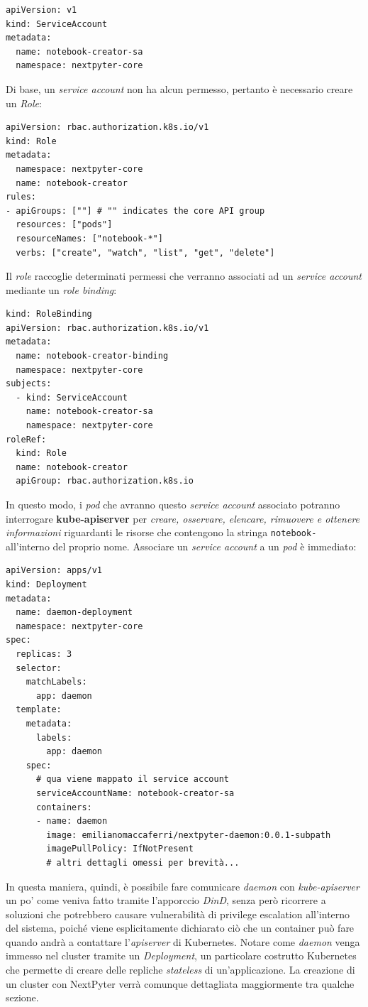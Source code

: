 \begin{verbatim}
apiVersion: v1
kind: ServiceAccount
metadata:
  name: notebook-creator-sa
  namespace: nextpyter-core
\end{verbatim}
Di base, un \textit{service account} non ha alcun permesso, pertanto è necessario creare un \textit{Role}:
\begin{verbatim}
apiVersion: rbac.authorization.k8s.io/v1
kind: Role
metadata:
  namespace: nextpyter-core
  name: notebook-creator
rules:
- apiGroups: [""] # "" indicates the core API group
  resources: ["pods"]
  resourceNames: ["notebook-*"]
  verbs: ["create", "watch", "list", "get", "delete"]
\end{verbatim}
Il \textit{role} raccoglie determinati permessi che verranno associati ad un \textit{service account} mediante un \textit{role binding}:
\begin{verbatim}
kind: RoleBinding
apiVersion: rbac.authorization.k8s.io/v1
metadata:
  name: notebook-creator-binding
  namespace: nextpyter-core
subjects:
  - kind: ServiceAccount
    name: notebook-creator-sa
    namespace: nextpyter-core
roleRef:
  kind: Role
  name: notebook-creator
  apiGroup: rbac.authorization.k8s.io
\end{verbatim}
In questo modo, i \textit{pod} che avranno questo \textit{service account} associato potranno interrogare \textbf{kube-apiserver} per \textit{creare, osservare, elencare, rimuovere e ottenere informazioni} riguardanti le risorse che contengono la stringa \verb|notebook-| all'interno del proprio nome.
\newline
Associare un \textit{service account} a un \textit{pod} è immediato:
\begin{verbatim}
apiVersion: apps/v1
kind: Deployment
metadata:
  name: daemon-deployment
  namespace: nextpyter-core
spec:
  replicas: 3
  selector:
    matchLabels:
      app: daemon
  template:
    metadata:
      labels:
        app: daemon
    spec:
      # qua viene mappato il service account
      serviceAccountName: notebook-creator-sa 
      containers:
      - name: daemon
        image: emilianomaccaferri/nextpyter-daemon:0.0.1-subpath
        imagePullPolicy: IfNotPresent
        # altri dettagli omessi per brevità... 
\end{verbatim}
In questa maniera, quindi, è possibile fare comunicare \textit{daemon} con \textit{kube-apiserver} un po' come veniva fatto tramite l'apporccio \textit{DinD}, senza però ricorrere a soluzioni che potrebbero causare vulnerabilità di privilege escalation all'interno del sistema, poiché viene esplicitamente dichiarato ciò che un container può fare quando andrà a contattare l'\textit{apiserver} di Kubernetes.
\newline
Notare come \textit{daemon} venga immesso nel cluster tramite un \textit{Deployment}, un particolare costrutto Kubernetes che permette di creare delle repliche \textit{stateless} di un'applicazione.
\newline
La creazione di un cluster con NextPyter verrà comunque dettagliata maggiormente tra qualche sezione.
\newpage
